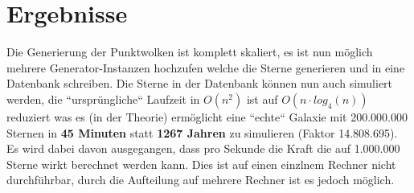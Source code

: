\section{Ergebnisse}

Die Generierung der Punktwolken ist komplett skaliert, es ist nun möglich
mehrere Generator-Instanzen hochzufen welche die Sterne generieren und in eine
Datenbank schreiben. Die Sterne in der Datenbank können nun auch simuliert
werden, die ``ursprüngliche`` Laufzeit in \( O(n^2) \) ist auf \( O(n \cdot
log_4(n)) \) reduziert was es (in der Theorie) ermöglicht eine ``echte``
Galaxie mit 200.000.000 Sternen in \textbf{45 Minuten} statt \textbf{1267
Jahren} zu simulieren (Faktor 14.808.695). Es wird dabei davon ausgegangen,
dass pro Sekunde die Kraft die auf 1.000.000 Sterne wirkt berechnet werden
kann. Dies ist auf einen einzlnem Rechner nicht durchführbar, durch die
Aufteilung auf mehrere Rechner ist es jedoch möglich.
